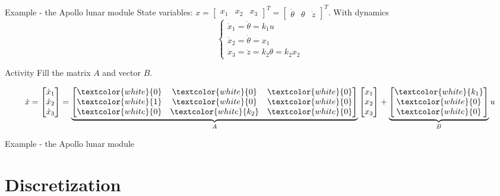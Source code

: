 \documentclass[presentation,aspectratio=1610]{beamer}
\begin{document}
\begin{frame}[label={sec:org380c798}]{Example - the Apollo lunar module}
State variables: \(x = \begin{bmatrix} x_1 & x_2 & x_3 \end{bmatrix}^T = \begin{bmatrix} \dot{\theta} & \theta & \dot{z} \end{bmatrix}^T\). With dynamics
\[ \begin{cases} \dot{x}_1 =  \ddot{\theta} = k_1 u\\ \dot{x}_2 = \dot{\theta} = x_1\\ \dot{x}_3 = \ddot{z} = k_2\theta = k_2x_2 \end{cases} \]

\alert{Activity} Fill the matrix \(A\) and vector \(B\).

\[ \dot{x} = \begin{bmatrix} \dot{x}_1\\\dot{x}_2\\\dot{x}_3\end{bmatrix} = \underbrace{\begin{bmatrix} \textcolor{white}{0} & \textcolor{white}{0} &\textcolor{white}{0} \\\textcolor{white}{1} & \textcolor{white}{0}& \textcolor{white}{0}\\ \textcolor{white}{0}& \textcolor{white}{k_2} &\textcolor{white}{0} \end{bmatrix}}_{A} \begin{bmatrix} x_1\\x_2\\x_3\end{bmatrix} + \underbrace{\begin{bmatrix} \textcolor{white}{k_1} \\ \textcolor{white}{0} \\\textcolor{white}{0}  \end{bmatrix}}_{B} u \]
\end{frame}

\begin{frame}[label={sec:orgd8545c5}]{Example - the Apollo lunar module}
\end{frame}


\section{Discretization}
\label{sec:orge61a8be}
\end{document}
